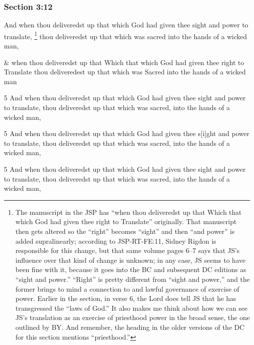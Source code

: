 	\subsubsection{Section 3:12}
		\label{DC3-12}

		And when thou deliveredst up that which God had given thee sight and power to translate,%
			\footnote{%
				\label{DC3-12-sight}%
				The manuscript in the JSP has ``when thou deliveredst up that Which that which God had given thee right to Translate'' originally. That manuscript then gets altered so the ``right'' becomes ``sight'' and then ``and power'' is added supralinearly; according to JSP-RT-FE:11, Sidney Rigdon is responsible for this change, but that same volume pages 6--7 says that JS's influence over that kind of change is unknown; in any case, JS seems to have been fine with it, because it goes into the BC and subsequent DC editions as ``sight and power.'' ``Right'' is pretty different from ``sight and power,'' and the former brings to mind a connection to \hyperref[EXOUSIA]{} and lawful governance of exercise of power. Earlier in the section, in verse 6, the Lord does tell JS that he has transgressed the ``laws of God.'' It also makes me think about how we can see JS's translation as an exercise of priesthood power in the broad sense, the one outlined by BY. And remember, the heading in the older versions of the DC for this section mentions ``priesthood.''
				}
		thou deliveredst up that which was sacred into the hands of a wicked man,

		\begin{framed}
		\scriptsize
			\begin{compactdesc}
				\item[JSP] \& when thou deliveredst up that Which that which God had given thee right to Translate thou deliveredest up that which was Sacred into the hands of a wicked man
				\item[BC] 5 And when thou deliveredst up that which God had given thee sight and power to translate, thou deliveredst up that which was sacred, into the hands of a wicked man,
				\item[DC 1835] 5 And when thou deliveredst up that which God had given thee s[i]ght and power to translate, thou deliveredst up that which was sacred, into the hands of a wicked man,
				\item[DC 1844] 5 And when thou deliveredst up that which God had given thee sight and power to translate, thou deliveredst up that which was sacred, into the hands of a wicked man,
			\end{compactdesc}
		\end{framed}

